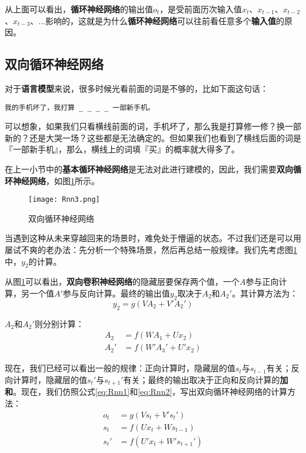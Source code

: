从上面可以看出，\textbf{循环神经网络}的输出值\(o_t\)，是受前面历次输入值\({x}_t\)、\({x}_{t-1}\)、\({x}_{t-2}\)、\({x}_{t-3}\)、...影响的，这就是为什么\textbf{循环神经网络}可以往前看任意多个\textbf{输入值}的原因。




\subsection{双向循环神经网络}\label{Rnn:4}

对于\textbf{语言模型}来说，很多时候光看前面的词是不够的，比如下面这句话：
\begin{lstlisting}[numbers=none]
    我的手机坏了，我打算 _ _ _ _ 一部新手机。
\end{lstlisting}


可以想象，如果我们只看横线前面的词，手机坏了，那么我是打算修一修？换一部新的？还是大哭一场？这些都是无法确定的。但如果我们也看到了横线后面的词是『一部新手机』，那么，横线上的词填『买』的概率就大得多了。

在上一小节中的\textbf{基本循环神经网络}是无法对此进行建模的，因此，我们需要\textbf{双向循环神经网络}，如图\ref{fig:Rnn3}所示。

\begin{figure}[!h]
	\centering
	\texttt{[image: Rnn3.png]}
	\caption{双向循环神经网络}
	\label{fig:Rnn3}
\end{figure}

当遇到这种从未来穿越回来的场景时，难免处于懵逼的状态。不过我们还是可以用屡试不爽的老办法：先分析一个特殊场景，然后再总结一般规律。我们先考虑图\ref{fig:Rnn3}中，\({y}_2\)的计算。

从图\ref{fig:Rnn3}可以看出，\textbf{双向卷积神经网络}的隐藏层要保存两个值，一个$A$参与正向计算，另一个值$A'$参与反向计算。最终的输出值\({y}_2\)取决于\(A_2\)和\(A_2'\)。其计算方法为：
\[
	{y}_2=g(VA_2+V'A_2')
\]

\(A_2\)和\(A_2'\)则分别计算：
\begin{align*}
	A_2  & =f(WA_1+U{x}_2)    \\
	A_2' & =f(W'A_3'+U'{x}_2)
\end{align*}


现在，我们已经可以看出一般的规律：正向计算时，隐藏层的值\({s}_t\)与\({s}_{t-1}\)有关；反向计算时，隐藏层的值\({s}_t'\)与\({s}_{t+1}'\)有关；最终的输出取决于正向和反向计算的\textbf{加和}。现在，我们仿照公式\ref{eq:Rnn1}和\ref{eq:Rnn2}，写出双向循环神经网络的计算方法：
\begin{align*}
	{o}_t  & =g(V{s}_t+V'{s}_t')      \\
	{s}_t  & =f(U{x}_t+W{s}_{t-1})    \\
	{s}_t' & =f(U'{x}_t+W'{s}_{t+1}')
\end{align*}


